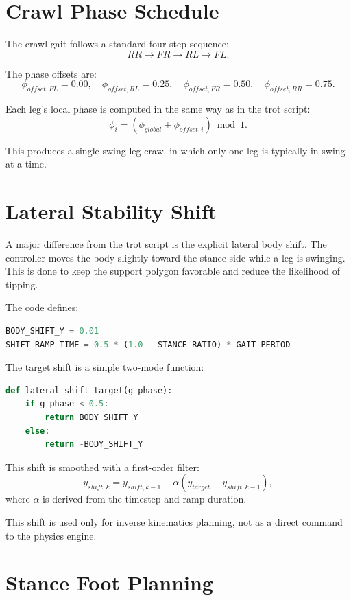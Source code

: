 \documentclass[11pt,a4paper]{report}
\begin{document}
\section{Crawl Phase Schedule}

The crawl gait follows a standard four-step sequence:
\[
RR \rightarrow FR \rightarrow RL \rightarrow FL.
\]

The phase offsets are:
\[
\phi_{offset,FL}=0.00,\quad
\phi_{offset,RL}=0.25,\quad
\phi_{offset,FR}=0.50,\quad
\phi_{offset,RR}=0.75.
\]

Each leg’s local phase is computed in the same way as in the trot script:
\[
\phi_i = (\phi_{global} + \phi_{offset,i}) \bmod 1.
\]

This produces a single-swing-leg crawl in which only one leg is typically in swing at a time.

\section{Lateral Stability Shift}

A major difference from the trot script is the explicit lateral body shift. The controller moves the body slightly toward the stance side while a leg is swinging. This is done to keep the support polygon favorable and reduce the likelihood of tipping.

The code defines:
\begin{lstlisting}[language=Python]
BODY_SHIFT_Y = 0.01
SHIFT_RAMP_TIME = 0.5 * (1.0 - STANCE_RATIO) * GAIT_PERIOD
\end{lstlisting}

The target shift is a simple two-mode function:
\begin{lstlisting}[language=Python]
def lateral_shift_target(g_phase):
    if g_phase < 0.5:
        return BODY_SHIFT_Y
    else:
        return -BODY_SHIFT_Y
\end{lstlisting}

This shift is smoothed with a first-order filter:
\[
y_{shift,k} = y_{shift,k-1} + \alpha(y_{target} - y_{shift,k-1}),
\]
where \(\alpha\) is derived from the timestep and ramp duration.

This shift is used only for inverse kinematics planning, not as a direct command to the physics engine.

\section{Stance Foot Planning}
\end{document}
